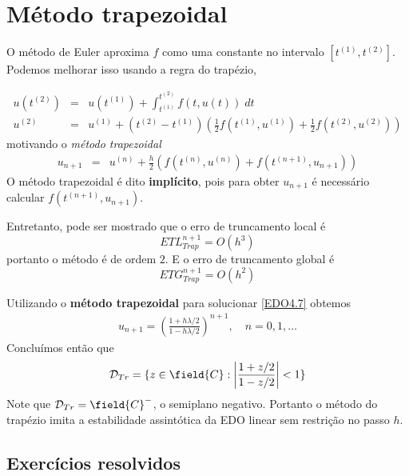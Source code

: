 \section{Método trapezoidal}
O método de Euler aproxima $f$ como uma constante no intervalo $[t^{(1)},t^{(2)}]$. Podemos melhorar isso usando a regra do trapézio,

\begin{eqnarray}
  u(t^{(2)}) &=& u(t^{(1)}) +  \int _{t^{(1)}}^{t^{(2)}}  f(t,u(t)) \; dt \\
  u^{(2)}    &=&   u^{(1)}  +  (t^{(2)}-t^{(1)})\left(\frac{1}{2}f(t^{(1)},u^{(1)})+\frac{1}{2}f(t^{(2)},u^{(2)})\right)
\end{eqnarray}
motivando o \emph{método trapezoidal}
\begin{eqnarray}
  u_{n+1} &=& u^{(n)} +  \frac{h}{2} \left(f(t^{(n)},u^{(n)})+f(t^{(n+1)},u_{n+1})\right)
\end{eqnarray}
O método trapezoidal é dito \textbf{implícito}, pois para obter $u_{n+1}$ é necessário calcular $f(t^{(n+1)},u_{n+1})$.

Entretanto, pode ser mostrado que o erro de truncamento local é
\begin{equation} ETL_{Trap}^{n+1}= O(h^3) \end{equation}
portanto o método é de ordem $2$. E o erro de truncamento global é
\begin{equation} ETG_{Trap}^{n+1}= O(h^2) \end{equation}


\begin{ex}
Utilizando o \textbf{método trapezoidal} para solucionar \eqref{EDO4.7} obtemos
\begin{eqnarray}
 u_{n+1} = \left(\frac{1+ h\lambda /2}{1- h\lambda /2}\right)^{n+1}, \quad  n=0,1,\ldots
\end{eqnarray}
Concluímos então que
\begin{eqnarray}
 \mathcal D_{Tr} = \{z \in  \field{C}:  \left|\frac{1+ z/2}{1- z/2}\right|<1\}
\end{eqnarray}
Note que $\mathcal D_{Tr}=\field{C}^-$, o semiplano negativo. Portanto o método do trapézio imita a estabilidade assintótica da EDO linear sem restrição no passo $h$.
\end{ex}



\subsection*{Exercícios resolvidos}

